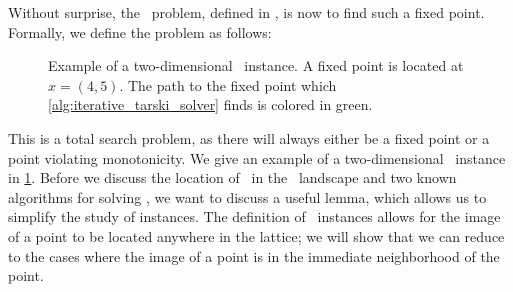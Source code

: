 Without surprise, the \Tarski\ problem, defined in , is now to find such a fixed point. Formally, we define the problem as follows:

\begin{figure}
	\centering
	\caption[Example of a \Tarski\ instance]{Example of a two-dimensional \Tarski\ instance. A fixed point is located at $x = (4, 5)$. The path to the fixed point which \cref{alg:iterative_tarski_solver} finds is colored in green.}
	\label{fig:tarski_example}
\end{figure}

This is a total search problem, as there will always either be a fixed point or a point violating monotonicity. We give an example of a two-dimensional \Tarski\ instance in \cref{fig:tarski_example}. Before we discuss the location of \Tarski\ in the \TFNP\ landscape and two known algorithms for solving \Tarski, we want to discuss a useful lemma, which allows us to simplify the study of \Tarski instances. The definition of \Tarski\ instances allows for the image of a point to be located anywhere in the lattice; we will show that we can reduce to the cases where the image of a point is in the immediate neighborhood of the point.

